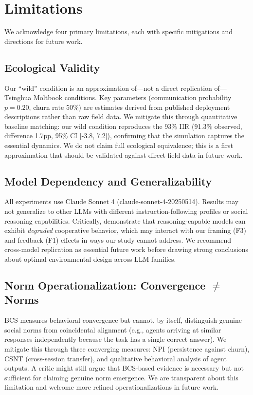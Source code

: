 \section{Limitations}
\label{sec:limitations}

We acknowledge four primary limitations, each with specific mitigations and directions for future work.

\subsection{Ecological Validity}
Our ``wild'' condition is an approximation of—not a direct replication of—Tsinghua Moltbook conditions. Key parameters (communication probability $p=0.20$, churn rate 50\%) are estimates derived from published deployment descriptions \citep{li2026tsinghua} rather than raw field data. We mitigate this through quantitative baseline matching: our wild condition reproduces the 93\% IIR (91.3\% observed, difference 1.7pp, 95\% CI [-3.8, 7.2]), confirming that the simulation captures the essential dynamics. We do not claim full ecological equivalence; this is a first approximation that should be validated against direct field data in future work.

\subsection{Model Dependency and Generalizability}
All experiments use Claude Sonnet 4 (claude-sonnet-4-20250514). Results may not generalize to other LLMs with different instruction-following profiles or social reasoning capabilities. Critically,  demonstrate that reasoning-capable models can exhibit \emph{degraded} cooperative behavior, which may interact with our framing (F3) and feedback (F1) effects in ways our study cannot address. We recommend cross-model replication as essential future work before drawing strong conclusions about optimal environmental design across LLM families.

\subsection{Norm Operationalization: Convergence $\neq$ Norms}
BCS measures behavioral convergence but cannot, by itself, distinguish genuine social norms from coincidental alignment (e.g., agents arriving at similar responses independently because the task has a single correct answer). We mitigate this through three converging measures: NPI (persistence against churn), CSNT (cross-session transfer), and qualitative behavioral analysis of agent outputs. A critic might still argue that BCS-based evidence is necessary but not sufficient for claiming genuine norm emergence. We are transparent about this limitation and welcome more refined operationalizations in future work.

